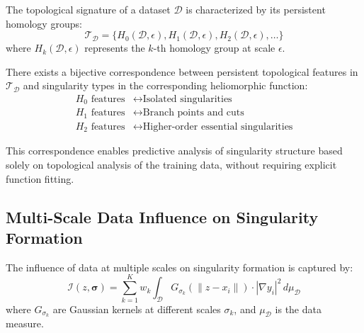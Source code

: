 \begin{definition}
\begin{enumerate}
\begin{definition}
The topological signature of a dataset $\mathcal{D}$ is characterized by its persistent homology groups:
\begin{equation}
\mathcal{T}_{\mathcal{D}} = \{H_0(\mathcal{D}, \epsilon), H_1(\mathcal{D}, \epsilon), H_2(\mathcal{D}, \epsilon), \ldots\}
\end{equation}
where $H_k(\mathcal{D}, \epsilon)$ represents the $k$-th homology group at scale $\epsilon$.
\end{definition}

\begin{theorem}
There exists a bijective correspondence between persistent topological features in $\mathcal{T}_{\mathcal{D}}$ and singularity types in the corresponding heliomorphic function:
\begin{align}
H_0 \text{ features} &\leftrightarrow \text{Isolated singularities} \\
H_1 \text{ features} &\leftrightarrow \text{Branch points and cuts} \\
H_2 \text{ features} &\leftrightarrow \text{Higher-order essential singularities}
\end{align}
\end{theorem}

This correspondence enables predictive analysis of singularity structure based solely on topological analysis of the training data, without requiring explicit function fitting.

\subsection{Multi-Scale Data Influence on Singularity Formation}

\begin{definition}
The influence of data at multiple scales on singularity formation is captured by:
\begin{equation}
\mathcal{I}(z, \boldsymbol{\sigma}) = \sum_{k=1}^{K} w_k \int_{\mathcal{D}} G_{\sigma_k}(\|z - x_i\|) \cdot |\nabla y_i|^2 \, d\mu_{\mathcal{D}}
\end{equation}
where $G_{\sigma_k}$ are Gaussian kernels at different scales $\sigma_k$, and $\mu_{\mathcal{D}}$ is the data measure.
\end{definition}


\end{enumerate}
\end{definition}

